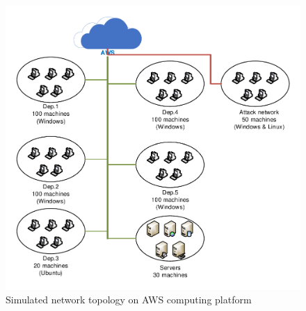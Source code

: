 \documentclass[journal]{IEEEtran}
\begin{document}
\begin{figure}[!htbp]
    \centering
    \includegraphics[scale=0.5]{fig/Topology.pdf}
    \caption{Simulated network topology on AWS computing platform}
    \label{fig:topology}
\end{figure}
\end{document}
